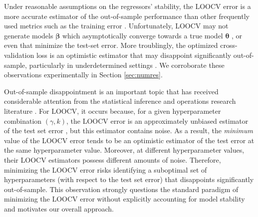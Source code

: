 \documentclass[opre,nonblindrev]{informs3} %
\begin{document}
Under reasonable assumptions on the regressors' stability, the LOOCV error is a more accurate estimator of the out-of-sample performance than other frequently used metrics such as the training error \citep[][]{bousquet2002stability}. Unfortunately, LOOCV may not generate models 
$\bm{\beta}$ which asymptotically converge towards a true model $\bm{\theta}$ \citep[see][for a counterexample]{shao1993linear}, or even %
that minimize the test-set error. %
More troublingly, the optimized cross-validation loss is an optimistic estimator that may disappoint significantly out-of-sample, particularly in underdetermined settings \citep{tibshirani2009bias}. We corroborate these observations experimentally in Section \ref{sec:numres}.

Out-of-sample disappointment is an important topic that has received considerable attention from the statistical inference and operations research literature \citep[][]{smith2006optimizer, kan2008distribution}. For LOOCV, it occurs because, for a given hyperparameter combination $(\gamma, k)$, the LOOCV error is an approximately unbiased estimator of the test set error \cite[c.f.][Chap. 7.10]{hastie2009elements}, but this estimator contains noise. As a result, the \textit{minimum} value of the LOOCV error tends to be an optimistic estimator of the test error at the same hyperparameter value. Moreover, at different hyperparameter values, their LOOCV estimators possess different amounts of noise. Therefore, minimizing the LOOCV error risks identifying a suboptimal set of hyperparameters (with respect to the test set error) that disappoints significantly out-of-sample. This observation strongly questions the standard paradigm of minimizing the LOOCV error without explicitly accounting for model stability and motivates our overall approach.
\end{document}
